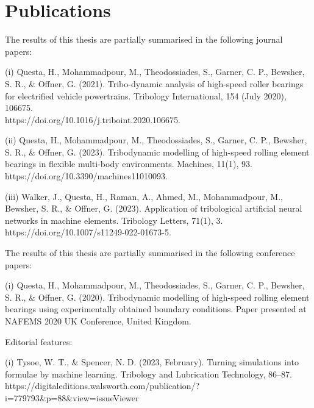 
\chapter*{Publications}

The results of this thesis are partially summarised in the following journal papers: %

\vspace{0.2cm}
\hspace{-1.7cm}(i) Questa, H., Mohammadpour, M., Theodossiades, S., Garner, C. P., Bewsher, S. R., \& Offner, G. (2021). Tribo-dynamic analysis of high-speed roller bearings for electrified vehicle powertrains. Tribology International, 154 (July 2020), 106675. \\https://doi.org/10.1016/j.triboint.2020.106675.

\vspace{0.2cm}
\hspace{-1.7cm}(ii) Questa, H., Mohammadpour, M., Theodossiades, S., Garner, C. P., Bewsher, S. R., \& Offner, G. (2023). Tribodynamic modelling of high-speed rolling element bearings in flexible multi-body environments. Machines, 11(1), 93. \\https://doi.org/10.3390/machines11010093.

\vspace{0.2cm}
\hspace{-1.7cm}(iii) Walker, J., Questa, H., Raman, A., Ahmed, M., Mohammadpour, M., Bewsher, S. R., \& Offner, G. (2023). Application of tribological artificial neural networks in machine elements. Tribology Letters, 71(1), 3. \\https://doi.org/10.1007/s11249-022-01673-5.

\vspace{1cm}
\hspace{-0.6cm}The results of this thesis are partially summarised in the following conference papers:

\vspace{0.2cm}
\hspace{-1.7cm}(i) Questa, H., Mohammadpour, M., Theodossiades, S., Garner, C. P., Bewsher, S. R., \& Offner, G. (2020). Tribodynamic modelling of high-speed rolling element bearings using experimentally obtained boundary conditions. Paper presented at NAFEMS 2020 UK Conference, United Kingdom.

\vspace{1cm}
\hspace{-0.6cm}Editorial features: %

\vspace{0.2cm}
\hspace{-1.7cm}(i) Tysoe, W. T., \& Spencer, N. D. (2023, February). Turning simulations into formulae by machine learning. Tribology and Lubrication Technology, 86–87. \\https://digitaleditions.walsworth.com/publication/?i=779793\&p=88\&view=issueViewer